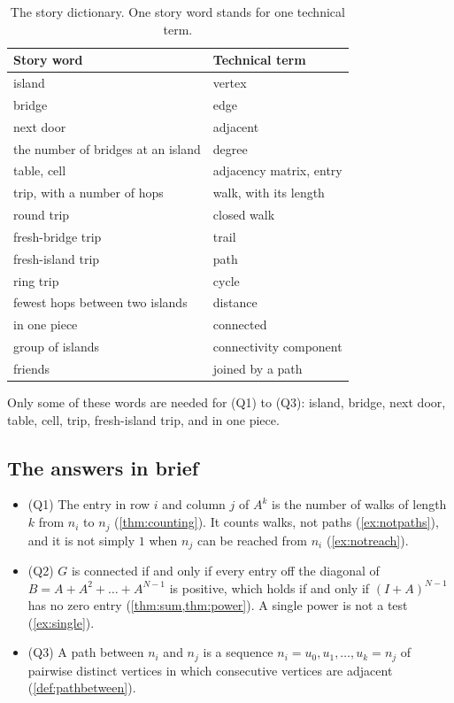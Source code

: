 \begin{table}[ht]
\centering
\begin{tabular}{@{}ll@{}}
\toprule
Story word & Technical term \\
\midrule
island & vertex \\
bridge & edge \\
next door & adjacent \\
the number of bridges at an island & degree \\
table, cell & adjacency matrix, entry \\
trip, with a number of hops & walk, with its length \\
round trip & closed walk \\
fresh-bridge trip & trail \\
fresh-island trip & path \\
ring trip & cycle \\
fewest hops between two islands & distance \\
in one piece & connected \\
group of islands & connectivity component \\
friends & joined by a path \\
\bottomrule
\end{tabular}
\caption{The story dictionary. One story word stands for one technical
term.}\label{tab:dictionary}
\end{table}

Only some of these words are needed for (Q1) to (Q3): island, bridge, next
door, table, cell, trip, fresh-island trip, and in one piece.

\subsection{The answers in brief}

\begin{itemize}
\item (Q1) The entry in row $i$ and column $j$ of $A^k$ is the number of
  walks of length $k$ from $n_i$ to $n_j$ (\cref{thm:counting}). It
  counts walks, not paths (\cref{ex:notpaths}), and it is not simply $1$
  when $n_j$ can be reached from $n_i$ (\cref{ex:notreach}).
\item (Q2) $G$ is connected if and only if every entry off the diagonal of
  $B=A+A^2+\dots+A^{N-1}$ is positive, which holds if and only if
  $(I+A)^{N-1}$ has no zero entry (\cref{thm:sum,thm:power}). A single
  power is not a test (\cref{ex:single}).
\item (Q3) A path between $n_i$ and $n_j$ is a sequence
  $n_i=u_0,u_1,\dots,u_k=n_j$ of pairwise distinct vertices in which
  consecutive vertices are adjacent (\cref{def:pathbetween}).
\end{itemize}

